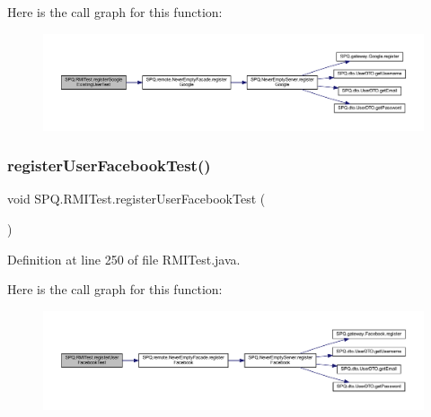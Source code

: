 Here is the call graph for this function\+:
\nopagebreak
\begin{figure}[H]
\begin{center}
\leavevmode
\includegraphics[width=350pt]{class_s_p_q_1_1_r_m_i_test_ad375aaea37b3b8f68c670f4c09834a7b_cgraph}
\end{center}
\end{figure}
\mbox{\label{class_s_p_q_1_1_r_m_i_test_aaba807356f43d06d07e10da5ce5a53c6}} 
\subsubsection{\texorpdfstring{register\+User\+Facebook\+Test()}{registerUserFacebookTest()}}
{\footnotesize\ttfamily void S\+P\+Q.\+R\+M\+I\+Test.\+register\+User\+Facebook\+Test (\begin{DoxyParamCaption}{ }\end{DoxyParamCaption})}



Definition at line 250 of file R\+M\+I\+Test.\+java.

Here is the call graph for this function\+:
\nopagebreak
\begin{figure}[H]
\begin{center}
\leavevmode
\includegraphics[width=350pt]{class_s_p_q_1_1_r_m_i_test_aaba807356f43d06d07e10da5ce5a53c6_cgraph}
\end{center}
\end{figure}
\mbox{\label{class_s_p_q_1_1_r_m_i_test_a18c26a1a1882c74b0ff9a0142c9492c8}} 
